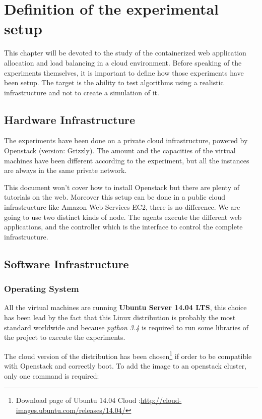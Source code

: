 \chapter{Definition of the experimental setup}
\label{chap:expsetup}

This chapter will be devoted to the study of the containerized web application
allocation and load balancing in a cloud environment. Before speaking of the
experiments themselves, it is important to define how those experiments have
been setup. The target is the ability to test algorithms using a realistic
infrastructure and not to create a simulation of it.

\section{Hardware Infrastructure}

The experiments have been done on a private cloud infrastructure, powered by
Openstack (version: Grizzly). The amount and the capacities of the virtual
machines have been different according to the experiment, but all the instances
are always in the same private network.

This document won't cover how to install Openstack but there are plenty of
tutorials on the web. Moreover this setup can be done in a public cloud
infrastructure like Amazon Web Services EC2, there is no difference. We are
going to use two distinct kinds of node. The agents execute the
different web applications, and the controller which is the interface to
control the complete infrastructure.

\section{Software Infrastructure}
\subsection{Operating System}

All the virtual machines are running \textbf{Ubuntu Server 14.04 LTS}, this choice
has been lead by the fact that this Linux distribution is probably the most standard
worldwide and because \textit{python 3.4} is required to run some libraries of the project
to execute the experiments.

The cloud version of the distribution has been chosen\footnote{Download page of
Ubuntu 14.04 Cloud :\url{http://cloud-images.ubuntu.com/releases/14.04/}} if
order to be compatible with Openstack and correctly boot. To add the image to
an openstack cluster, only one command is required:

